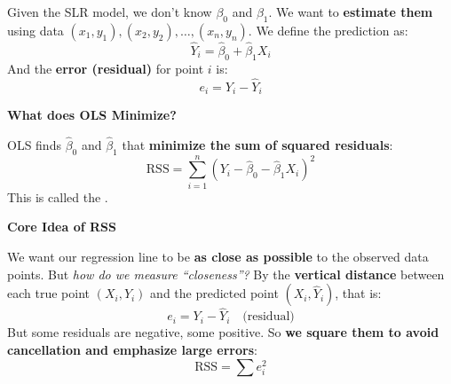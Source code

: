 \highspace
Given the SLR model, we don't know $\beta_{0}$ and $\beta_{1}$. We want to \textbf{estimate them} using data $\left(x_{1}, y_{1}\right), \left(x_{2}, y_{2}\right), \dots, \left(x_{n}, y_{n}\right)$. We define the prediction as:
\begin{equation*}
    \hat{Y}_i = \hat{\beta}_0 + \hat{\beta}_1 X_i
\end{equation*}
And the \textbf{error (residual)} for point $i$ is:
\begin{equation}
    e_i = Y_i - \hat{Y}_i
\end{equation}

\highspace
\begin{flushleft}
    \textcolor{Green3}{ \textbf{What does OLS Minimize?}}
\end{flushleft}
OLS finds $\hat{\beta}_0$ and $\hat{\beta}_1$ that \textbf{minimize the sum of squared residuals}:
\begin{equation}
    \text{RSS} = \displaystyle\sum_{i=1}^{n} (Y_i - \hat{\beta}_0 - \hat{\beta}_1 X_i)^2
\end{equation}
This is called the . 

\highspace
\begin{flushleft}
    \textcolor{Green3}{ \textbf{Core Idea of RSS}}
\end{flushleft}
We want our regression line to be \textbf{as close as possible} to the observed data points. But \emph{how do we measure ``closeness''?} By the \textbf{vertical distance} between each true point $\left(X_{i}, Y_{i}\right)$ and the predicted point $(X_{i}, \hat{Y}_{i})$, that is:
\begin{equation*}
    e_i = Y_i - \hat{Y}_i \quad \text{(residual)}
\end{equation*}
But some residuals are negative, some positive. So \textbf{we square them to avoid cancellation and emphasize large errors}:
\begin{equation*}
    \text{RSS} = \displaystyle\sum e_{i}^{2}
\end{equation*}

